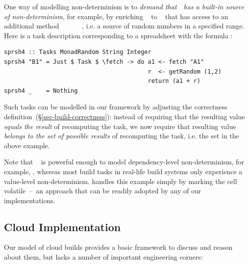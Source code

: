 One way of modelling non-determinism is to \emph{demand that}~~\emph{has a
built-in source of non-determinism}, for example, by enriching
~ to ~ that has access to an
additional method
~\hs{::}~~~\hs{->}~~,
i.e. a source of random numbers in a specified range. Here is a task description
corresponding to a spreadsheet with the formula :

\begin{verbatim}
sprsh4 :: Tasks MonadRandom String Integer
sprsh4 "B1" = Just $ Task $ \fetch -> do a1 <- fetch "A1"
                                         r  <- getRandom (1,2)
                                         return (a1 + r)
sprsh4 _    = Nothing
\end{verbatim}
\vspace{1mm}

\noindent
Such tasks can be modelled in our framework by adjusting the correctness
definition~(\S\ref{sec-build-correctness}): instead of requiring that the
resulting value \emph{equals the result} of recomputing the task, we now require
that resulting value \emph{belongs to the set of possible results} of
recomputing the task, i.e. the set  in the above
example.


Note that ~ is powerful enough to model
dependency-level non-determinism, for example,
, whereas most build tasks in real-life
build systems only experience a value-level non-determinism. \Excel handles this
example simply by marking the cell volatile~--~an approach that can be readily
adopted by any of our implementations.

\subsection{Cloud Implementation}\label{sec-cloud-aspects}

Our model of cloud builds provides a basic framework to discuss and reason
about them, but lacks a number of important engineering corners:

